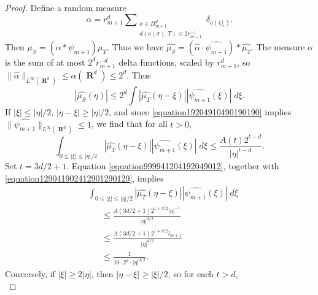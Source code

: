 \documentclass[12pt,reqno]{article}
\numberwithin{equation}{section}
\DeclareMathOperator{\RR}{\mathbf{R}}
\begin{document}
\begin{proof}
    Define a random measure
    \[ \alpha = r_{m+1}^d \sum\nolimits_{\substack{\sigma \in \Pi_{m+1}^d\\d(a(\sigma),T) \leq 2 r_{m+1}^{-1}}} \delta_{a(ij_i)}. \]
    Then $\mu_S = (\alpha * \psi_{m+1}) \mu_T$.
    Thus we have $\widehat{\mu_S} = (\widehat{\alpha} \cdot \widehat{\psi_{m+1}}) * \widehat{\mu_T}$. The measure $\alpha$ is the sum of at most $2^d r_{m+1}^{-d}$ delta functions, scaled by $r_{m+1}^d$, so $\| \widehat{\alpha} \|_{L^\infty(\RR^d)} \leq \alpha(\RR^d) \leq 2^d$. Thus
    \begin{equation} \label{equation9942941924912912}
        |\widehat{\mu_S}(\eta)| \leq 2^d \int |\widehat{\mu_T}(\eta - \xi)| |\widehat{\psi_{m+1}}(\xi)|\; d\xi.
    \end{equation}
    If $|\xi| \leq |\eta|/2$, $|\eta - \xi| \geq |\eta|/2$, and since \eqref{equation19204910490190190} implies $\| \widehat{\psi_{m+1}} \|_{L^\infty(\RR^d)} \leq 1$, we find that for all $t > 0$,
    \begin{equation} \label{equation999941204192049012}
        \int_{0 \leq |\xi| \leq |\eta|/2} |\widehat{\mu_T}(\eta - \xi)| |\widehat{\psi_{m+1}}(\xi)|\; d\xi \leq \frac{A(t) 2^{t-d}}{|\eta|^{t-d}}.
    \end{equation}
    Set $t = 3d/2 + 1$. Equation \eqref{equation999941204192049012}, together with \eqref{equation129041902412901290129}, implies
    \begin{equation} \label{equation1111902491209012}
    \begin{split}
        &\int_{0 \leq |\xi| \leq |\eta|/2} |\widehat{\mu_T}(\eta - \xi)| |\widehat{\psi_{m+1}}(\xi)|\; d\xi\\
        &\ \ \ \ \ \ \ \leq \frac{A(3d/2 + 1) 2^{1 + d/2} |\eta|^{-1}}{|\eta|^{d/2}}\\
        &\ \ \ \ \ \ \ \leq \frac{A(3d/2 + 1) 2^{1 + d/2} l_{m+1}}{|\eta|^{d/2}}\\
        &\ \ \ \ \ \ \ \leq \frac{1}{10 \cdot 2^d \cdot |\eta|^{d/2}}.
    \end{split}
    \end{equation}
    Conversely, if $|\xi| \geq 2|\eta|$, then $|\eta - \xi| \geq |\xi|/2$, so for each $t > d$,
    \begin{equation} \label{equation5551092491022109}

\end{equation}
\end{proof}
\end{document}
